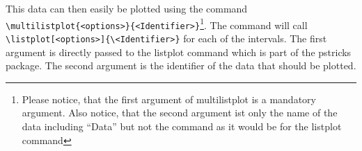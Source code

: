 This data can then easily be plotted using the command\\
\verb+\multilistplot{<options>}{<Identifier>}+\footnote{Please notice, that the
first argument of multilistplot is a mandatory argument. Also notice, that the
second argument ist only the name of the data including ``Data'' but not the
command as it would be for the listplot command}.
The command will call\\
\verb+\listplot[<options>]{\<Identifier>}+ for each of
the intervals. The first argument is directly passed to the listplot command which is part of the
pstricks package. The second argument is the identifier of the data that should
be plotted.

\begin{minipage}[T]{0.5\linewidth}
	
\end{minipage}
\hspace{1ex}
\begin{minipage}[T]{0.4\linewidth}
	
\end{minipage}

